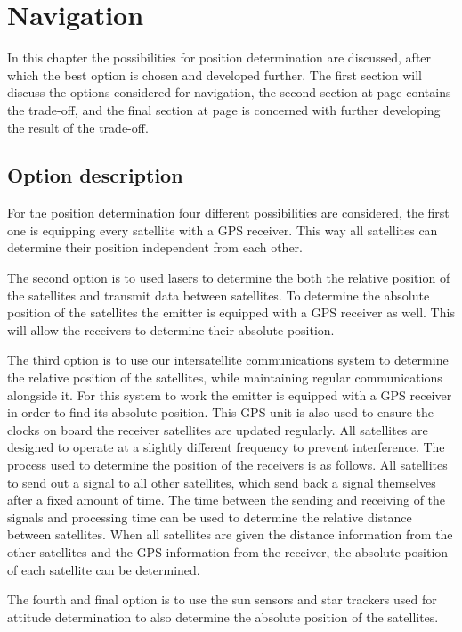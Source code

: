 \documentclass[11pt]{report}
\begin{document}
\chapter{Navigation}
\label{Navi}
In this chapter the possibilities for position determination are discussed, after which the best option is chosen and developed further. The first section will discuss the options considered for navigation, the second section at page \pageref{navi2} contains the trade-off, and the final section at page \pageref{navi3} is concerned with further developing the result of the trade-off.

\section{Option description}
\label{navi1}
For the position determination four different possibilities are considered, the first one is equipping every satellite with a \acs{GPS} receiver. This way all satellites can determine their position independent from each other.

The second option is to used lasers to determine the both the relative position of the satellites and transmit data between satellites. To determine the absolute position of the satellites the emitter is equipped with a \acs{GPS} receiver as well. This will allow the receivers to determine their absolute position.

The third option is to use our intersatellite communications system to determine the relative position of the satellites, while maintaining regular communications alongside it. For this system to work the emitter is equipped with a GPS receiver in order to find its absolute position. This GPS unit is also used to ensure the clocks on board the receiver satellites are updated regularly. All satellites are designed to operate at a slightly different frequency to prevent interference. The process used to determine the position of the receivers is as follows. All satellites to send out a signal to all other satellites, which send back a signal themselves after a fixed amount of time. The time between the sending and receiving of the signals and processing time can be used to determine the relative distance between satellites. When all satellites are given the distance information from the other satellites and the GPS information from the receiver, the absolute position of each satellite can be determined.

The fourth and final option is to use the sun sensors and star trackers used for attitude determination to also determine the absolute position of the satellites.
\end{document}
